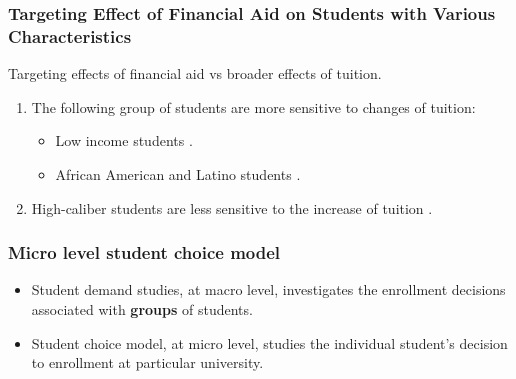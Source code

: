 \documentclass[aspectratio=169]{beamer}
\begin{document}
\begin{frame}
    \frametitle{Targeting Effect of Financial Aid on Students 
    with Various Characteristics}

Targeting effects of financial aid vs broader effects of tuition.

\begin{enumerate}
  \item The following group of students are more sensitive to 
  changes of tuition:

 \begin{itemize}
 \item Low income students \citep{Crouse2015}.
 \item  African American and Latino students \citep{Hossler1989}.
 \end{itemize}
 
\item High-caliber students are less sensitive to
 the increase of tuition \citep{Heller1999}.

\end{enumerate}



\end{frame}





\begin{frame}
  \frametitle{Micro level student choice model}
  \begin{itemize}
    \item Student demand studies, at macro level, investigates the 
    enrollment decisions associated with \textbf{groups} of students.
    \item Student choice model, at micro level, studies the individual
student's decision to enrollment at particular university.
  \end{itemize}
  

  \end{frame}
\end{document}
